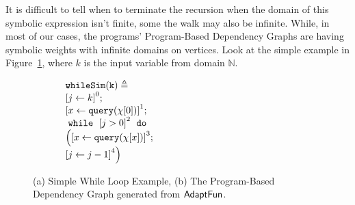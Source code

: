 It is difficult to tell when to terminate the recursion when the domain of this symbolic expression isn't finite, some the walk may also be infinite.
While, in most of our cases, the programs' Program-Based Dependency Graphs are having symbolic weights with infinite domains on vertices.
Look at the simple example in Figure~\ref{fig:alg_adaptsearch_simplewhile}, where $k$ is the input variable from domain $\mathbb{N}$.
\begin{figure}
\centering
{
\begin{subfigure}{.25\textwidth}
\begin{centering}
$ 
\begin{array}{l}
  \kw{whileSim(k)} \triangleq \\
  \clabel{ \assign{j}{k} }^{0} ; \\
  \clabel{ \assign{x}{\query(\chi[0])} }^{1} ; \\
      \ewhile ~ \clabel{j > 0}^{2} ~ \edo ~ \\
      \Big(
       \clabel{\assign{x}{\query(\chi[x]) }}^{3}  ; \\
      \clabel{\assign{j}{j-1}}^{4}       \Big)
  \end{array}
$
\caption{}
\end{centering}
\end{subfigure}
\quad
  \begin{subfigure}{.6\textwidth}
  \begin{centering}
\caption{}
  \end{centering}
  \end{subfigure}
}
\vspace{-0.4cm}
 \caption{(a) Simple While Loop Example, (b) The Program-Based Dependency Graph generated from $\textsf{AdaptFun}$.}
\label{fig:alg_adaptsearch_simplewhile}
\vspace{-0.5cm}
\end{figure}
